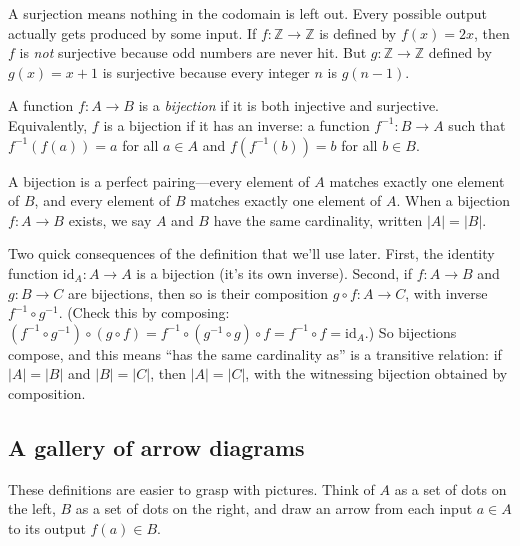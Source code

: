 \documentclass[11pt]{article}
\begin{document}
A surjection means nothing in the codomain is left out. Every possible output actually gets produced by some input. If $f : \mathbb{Z} \to \mathbb{Z}$ is defined by $f(x) = 2x$, then $f$ is \emph{not} surjective because odd numbers are never hit. But $g : \mathbb{Z} \to \mathbb{Z}$ defined by $g(x) = x + 1$ is surjective because every integer $n$ is $g(n-1)$.

\begin{definition}[Bijection]
A function $f : A \to B$ is a \emph{bijection} if it is both injective and surjective. Equivalently, $f$ is a bijection if it has an inverse: a function $f^{-1} : B \to A$ such that $f^{-1}(f(a)) = a$ for all $a \in A$ and $f(f^{-1}(b)) = b$ for all $b \in B$.
\end{definition}

A bijection is a perfect pairing---every element of $A$ matches exactly one element of $B$, and every element of $B$ matches exactly one element of $A$. When a bijection $f : A \to B$ exists, we say $A$ and $B$ have the same cardinality, written $|A| = |B|$.

Two quick consequences of the definition that we'll use later. First, the identity function $\mathrm{id}_A : A \to A$ is a bijection (it's its own inverse). Second, if $f : A \to B$ and $g : B \to C$ are bijections, then so is their composition $g \circ f : A \to C$, with inverse $f^{-1} \circ g^{-1}$. (Check this by composing: $(f^{-1} \circ g^{-1}) \circ (g \circ f) = f^{-1} \circ (g^{-1} \circ g) \circ f = f^{-1} \circ f = \mathrm{id}_A$.) So bijections compose, and this means ``has the same cardinality as'' is a transitive relation: if $|A| = |B|$ and $|B| = |C|$, then $|A| = |C|$, with the witnessing bijection obtained by composition.

\subsection*{A gallery of arrow diagrams}

These definitions are easier to grasp with pictures. Think of $A$ as a set of dots on the left, $B$ as a set of dots on the right, and draw an arrow from each input $a \in A$ to its output $f(a) \in B$.
\end{document}
